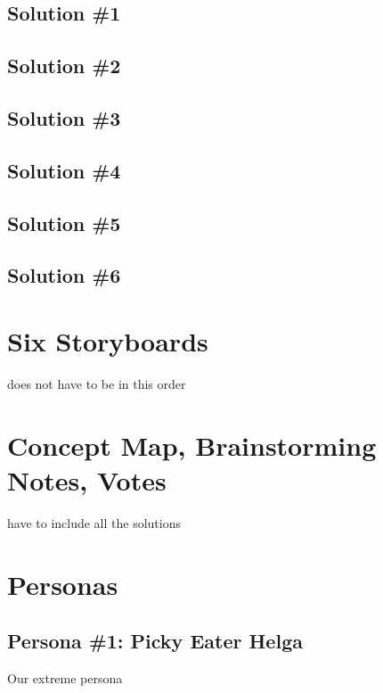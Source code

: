 \documentclass[a4paper,10pt,oneside]{scrreprt}
\begin{document}
		\subsection{Solution \#1}
		
		\subsection{Solution \#2}
		
		\subsection{Solution \#3}
		
		\subsection{Solution \#4}
		
		\subsection{Solution \#5}
		
		\subsection{Solution \#6}
		
		\bigskip
		
	\section{Six Storyboards}
		does not have to be in this order
		
	\section{Concept Map, Brainstorming Notes, Votes}
		have to include all the solutions
		
	\clearpage
	\section{Personas}
	
		\subsection{Persona \#1: Picky Eater Helga}
		
		Our extreme persona
		
\end{document}
